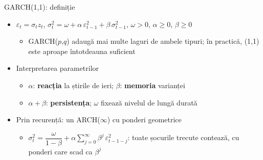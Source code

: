 \begin{frame}{GARCH(1,1): definiție}
\itemsize{\small}
\begin{itemize}
    \item $\varepsilon_t = \sigma_t z_t$, \quad $\sigma_t^2 = \omega + \alpha\,\varepsilon_{t-1}^2 + \beta\,\sigma_{t-1}^2$, \quad $\omega > 0$, $\alpha \ge 0$, $\beta \ge 0$
    \begin{itemize}
        \item GARCH($p$,$q$) adaugă mai multe laguri de ambele tipuri; în practică, (1,1) este aproape întotdeauna suficient
    \end{itemize}
    \item Interpretarea parametrilor
    \begin{itemize}
        \item $\alpha$: \textbf{reacția} la știrile de ieri; $\beta$: \textbf{memoria} varianței
        \item $\alpha + \beta$: \textbf{persistența}; $\omega$ fixează nivelul de lungă durată
    \end{itemize}
    \item Prin recurență: un ARCH($\infty$) cu ponderi geometrice
    \begin{itemize}
        \item $\sigma_t^2 = \dfrac{\omega}{1 - \beta} + \alpha\sum_{j=0}^{\infty}\beta^j\,\varepsilon_{t-1-j}^2$: toate șocurile trecute contează, cu ponderi care scad ca $\beta^j$
    \end{itemize}
\end{itemize}
\end{frame}

